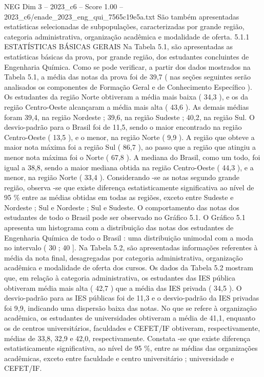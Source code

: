 \begin{textsample}{NEG Dim 3 – 2023\_c6 – Score 1.00 – 2023\_c6/enade\_2023\_eng\_qui\_7565c19e5a.txt}
São também apresentadas estatísticas selecionadas de subpopulações, caracterizadas por grande região, categoria administrativa, organização acadêmica e modalidade de oferta. 5.1.1 ESTATÍSTICAS BÁSICAS GERAIS Na Tabela 5.1, são apresentadas as estatísticas básicas da prova, por grande região, dos estudantes concluintes de Engenharia Química.
Como se pode verificar, a partir dos dados mostrados na Tabela 5.1, a média das notas da prova foi de 39,7 ( nas seções seguintes serão analisados os componentes de Formação Geral e de Conhecimento Específico ).
Os estudantes da região Norte obtiveram a média mais baixa ( 34,3 ), e os da região Centro-Oeste alcançaram a média mais alta ( 43,6 ).
As demais médias foram 39,4, na região Nordeste ; 39,6, na região Sudeste ; 40,2, na região Sul.
O desvio-padrão para o Brasil foi de 11,5, sendo o maior encontrado na região Centro-Oeste ( 13,5 ), e o menor, na região Norte ( 9,9 ).
A região que obteve a maior nota máxima foi a região Sul ( 86,7 ), ao passo que a região que atingiu a menor nota máxima foi o Norte ( 67,8 ).
A mediana do Brasil, como um todo, foi igual a 38,8, sendo a maior mediana obtida na região Centro-Oeste ( 44,3 ), e a menor, na região Norte ( 33,4 ).
Considerando -se as notas segundo grande região, observa -se que existe diferença estatisticamente significativa ao nível de 95 \% entre as médias obtidas em todas as regiões, exceto entre Sudeste e Nordeste ; Sul e Nordeste ; Sul e Sudeste.
O comportamento das notas dos estudantes de todo o Brasil pode ser observado no Gráfico 5.1.
O Gráfico 5.1 apresenta um histograma com a distribuição das notas dos estudantes de Engenharia Química de todo o Brasil : uma distribuição unimodal com a moda no intervalo ( 30 ; 40 ].
Na Tabela 5.2, são apresentadas informações referentes à média da nota final, desagregadas por categoria administrativa, organização acadêmica e modalidade de oferta dos cursos.
Os dados da Tabela 5.2 mostram que, em relação à categoria administrativa, os estudantes das IES pública obtiveram média mais alta ( 42,7 ) que a média das IES privada ( 34,5 ).
O desvio-padrão para as IES públicas foi de 11,3 e o desvio-padrão da IES privadas foi 9,9, indicando uma dispersão baixa das notas.
No que se refere à organização acadêmica, os estudantes de universidades obtiveram a média de 41,1, enquanto os de centros universitários, faculdades e CEFET/IF obtiveram, respectivamente, médias de 33,8, 32,9 e 42,0, respectivamente.
Constata -se que existe diferença estatisticamente significativa, ao nível de 95 \%, entre as médias das organizações acadêmicas, exceto entre faculdade e centro universitário ; universidade e CEFET/IF.

\end{textsample}
